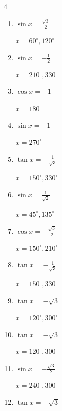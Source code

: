 \begin{multicols}{4}
\begin{enumerate}
  \item $\displaystyle \sin{x}  = \frac{\sqrt{3}}{2}$

        $\displaystyle x = 60^{\circ} , 120^{\circ}$

  \item $\displaystyle \sin{x}  = -\frac{1}{2}$

        $\displaystyle x = 210^{\circ} , 330^{\circ}$

  \item $\displaystyle \cos{x}  = -1$

        $\displaystyle x = 180^{\circ}$

  \item $\displaystyle \sin{x}  = -1$

        $\displaystyle x = 270^{\circ}$

  \item $\displaystyle \tan{x}  = -\frac{1}{\sqrt{3}}$

        $\displaystyle x = 150^{\circ} , 330^{\circ}$

  \item $\displaystyle \sin{x}  = \frac{1}{\sqrt{2}}$

        $\displaystyle x = 45^{\circ} , 135^{\circ}$

  \item $\displaystyle \cos{x}  = -\frac{\sqrt{3}}{2}$

        $\displaystyle x = 150^{\circ} , 210^{\circ}$

  \item $\displaystyle \tan{x}  = -\frac{1}{\sqrt{3}}$

        $\displaystyle x = 150^{\circ} , 330^{\circ}$

  \item $\displaystyle \tan{x}  = -\sqrt{3}$

        $\displaystyle x = 120^{\circ} , 300^{\circ}$

  \item $\displaystyle \tan{x}  = -\sqrt{3}$

        $\displaystyle x = 120^{\circ} , 300^{\circ}$

  \item $\displaystyle \sin{x}  = -\frac{\sqrt{3}}{2}$

        $\displaystyle x = 240^{\circ} , 300^{\circ}$

\columnbreak %

  \item $\displaystyle \tan{x}  = -\sqrt{3}$


\end{enumerate}
\end{multicols}
